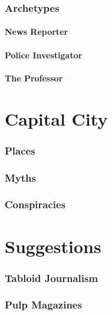 \documentclass[11pt]{article}
\begin{document}
\begin{multicols}{2}
\lipsum[1]

\section{Archetypes}

\lipsum[1]

\subsection{News Reporter}

\lipsum[1]

\subsection{Police Investigator}

\lipsum[1]

\subsection{The Professor}

\lipsum[1]

\part{Capital City}

\lipsum[1]

\section{Places}

\lipsum[1]

\section{Myths}

\lipsum[1]

\section{Conspiracies}

\lipsum[1]

\part{Suggestions}

\lipsum[1]

\section{Tabloid Journalism}

\lipsum[1]

\section{Pulp Magazines}

\lipsum[1]

\end{multicols}
\end{document}
